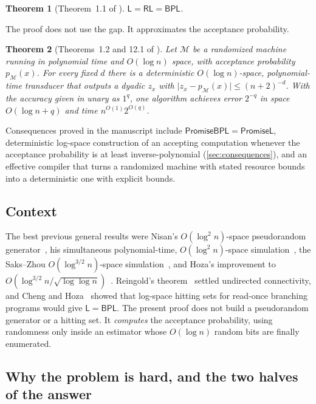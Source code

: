 \documentclass[11pt]{article}
\newtheorem{theorem}{Theorem}[section]
\theoremstyle{definition}
\theoremstyle{remark}
\newcommand{\abs}[1]{\lvert #1\rvert}
\newcommand{\Lc}{\mathsf L}
\newcommand{\RL}{\mathsf{RL}}
\newcommand{\BPL}{\mathsf{BPL}}
\begin{document}
\begin{theorem}[Theorem~1.1 of \cite{OpenAI-BPL}]\label{thm:main}
$\Lc=\RL=\BPL$.
\end{theorem}

The proof does not use the gap. It approximates the acceptance probability.

\begin{theorem}[Theorems~1.2 and 12.1 of \cite{OpenAI-BPL}]\label{thm:approx}
Let $\mathcal M$ be a randomized machine running in polynomial time and
$O(\log n)$ space, with acceptance probability $p_{\mathcal M}(x)$. For every fixed
$d$ there is a deterministic $O(\log n)$-space, polynomial-time transducer that
outputs a dyadic $z_x$ with $\abs{z_x-p_{\mathcal M}(x)}\le(n+2)^{-d}$. With the
accuracy given in unary as $1^q$, one algorithm achieves error $2^{-q}$ in space
$O(\log n+q)$ and time $n^{O(1)}2^{O(q)}$.
\end{theorem}

Consequences proved in the manuscript include $\mathsf{PromiseBPL}=\mathsf{PromiseL}$,
deterministic log-space construction of an accepting computation whenever the
acceptance probability is at least inverse-polynomial (\cref{sec:consequences}),
and an effective compiler that turns a randomized machine with stated resource
bounds into a deterministic one with explicit bounds.

\subsection{Context}

The best previous general results were Nisan's $O(\log^2n)$-space pseudorandom
generator~\cite{Nisan92}, his simultaneous polynomial-time,
$O(\log^2n)$-space simulation~\cite{Nisan94}, the Saks--Zhou
$O(\log^{3/2}n)$-space simulation~\cite{SaksZhou}, and Hoza's improvement to
$O(\log^{3/2}n/\sqrt{\log\log n})$~\cite{Hoza21}. Reingold's theorem~\cite{Reingold}
settled undirected connectivity, and Cheng and Hoza~\cite{ChengHoza} showed that
log-space hitting sets for read-once branching programs would give $\Lc=\BPL$.
The present proof does not build a pseudorandom generator or a hitting set. It
\emph{computes} the acceptance probability, using randomness only inside an
estimator whose $O(\log n)$ random bits are finally enumerated.

\subsection{Why the problem is hard, and the two halves of the answer}
\end{document}
